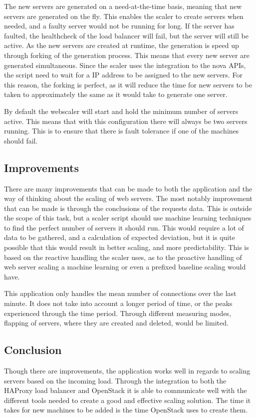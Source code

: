The new servers are generated on a need-at-the-time basis, meaning that new
servers are generated on the fly. This enables the scaler to create servers
when needed, and a faulty server would not be running for long. If the server
has faulted, the healthcheck of the load balancer will fail, but the server
will still be active. As the new servers are created at runtime, the generation
is speed up through forking of the generation process. This means that every
new server are generated simultaneous. Since the scaler uses the integration to
the nova APIs, the script need to wait for a IP address to be assigned to the
new servers. For this reason, the forking is perfect, as it will reduce the
time for new servers to be taken to approximately the same as it would take to
generate one server.

By default the webscaler will start and hold the minimum number of servers
active. This means that with this configuration there will always be two
servers running. This is to ensure that there is fault tolerance if one of the
machines should fail.


\subsection{Improvements}
There are many improvements that can be made to both the application and the
way of thinking about the scaling of web servers. The most notably improvement
that can be made is through the conclusions of the requests data. This is
outside the scope of this task, but a scaler script should use machine learning
techniques to find the perfect number of servers it should run. This would
require a lot of data to be gathered, and a calculation of expected deviation,
but it is quite possible that this would result in better scaling, and more
predictability. This is based on the reactive handling the scaler uses, as to
the proactive handling of web server scaling a machine learning or even a
prefixed baseline scaling would have.

This application only handles the mean number of connections over the last
minute. It does not take into account a longer period of time, or the peaks
experienced through the time period. Through different measuring modes,
flapping of servers, where they are created and deleted, would be limited.

\subsection{Conclusion}
Though there are improvements, the application works well in regards to scaling
servers based on the incoming load. Through the integration to both the HAProxy
load balancer and OpenStack it is able to communicate well with the different
tools needed to create a good and effective scaling solution. The time it takes
for new machines to be added is the time OpenStack uses to create them.

